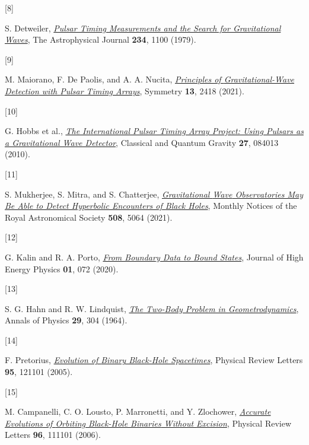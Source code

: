 \documentclass[
  10pt,
  a4paper,
  DIV=11,
  numbers=noendperiod,
  twoside]{scrreprt}
\newlength{\cslhangindent}
\newlength{\csllabelwidth}
\newlength{\cslentryspacingunit} %
\newenvironment{CSLReferences}[2] %
 {%
  \setlength{\parindent}{0pt}
  \ifodd #1
  \let\oldpar\par
  \def\par{\hangindent=\cslhangindent\oldpar}
  \fi
  \setlength{\parskip}{#2\cslentryspacingunit}
 }%
 {}
\newcommand{\CSLLeftMargin}[1]{\parbox[t]{\csllabelwidth}{#1}}
\newcommand{\CSLRightInline}[1]{\parbox[t]{\linewidth - \csllabelwidth}{#1}\break}
\DeclareRobustCommand{\[}{\begin{equation}}
\DeclareRobustCommand{\]}{\end{equation}}
\begin{document}
\begin{CSLReferences}{0}{0}
\leavevmode{}%
\CSLLeftMargin{{[}8{]} }%
\CSLRightInline{S. Detweiler,
\emph{\href{https://doi.org/10.1086/157593}{Pulsar Timing Measurements
and the Search for Gravitational Waves}}, The Astrophysical Journal
\textbf{234}, 1100 (1979).}

\leavevmode{}%
\CSLLeftMargin{{[}9{]} }%
\CSLRightInline{M. Maiorano, F. De Paolis, and A. A. Nucita,
\emph{\href{https://doi.org/10.3390/sym13122418}{Principles of
{Gravitational-Wave Detection} with {Pulsar Timing Arrays}}}, Symmetry
\textbf{13}, 2418 (2021).}

\leavevmode{}%
\CSLLeftMargin{{[}10{]} }%
\CSLRightInline{G. Hobbs et al.,
\emph{\href{https://doi.org/10.1088/0264-9381/27/8/084013}{The
International Pulsar Timing Array Project: Using Pulsars as a
Gravitational Wave Detector}}, Classical and Quantum Gravity
\textbf{27}, 084013 (2010).}

\leavevmode{}%
\CSLLeftMargin{{[}11{]} }%
\CSLRightInline{S. Mukherjee, S. Mitra, and S. Chatterjee,
\emph{\href{https://doi.org/10.1093/mnras/stab2721}{Gravitational {Wave}
Observatories May Be Able to Detect Hyperbolic Encounters of {Black
Holes}}}, Monthly Notices of the Royal Astronomical Society
\textbf{508}, 5064 (2021).}

\leavevmode{}%
\CSLLeftMargin{{[}12{]} }%
\CSLRightInline{G. Kalin and R. A. Porto,
\emph{\href{https://doi.org/10.1007/JHEP01(2020)072}{From Boundary Data
to Bound States}}, Journal of High Energy Physics \textbf{01}, 072
(2020).}

\leavevmode{}%
\CSLLeftMargin{{[}13{]} }%
\CSLRightInline{S. G. Hahn and R. W. Lindquist,
\emph{\href{https://doi.org/10.1016/0003-4916(64)90223-4}{The Two-Body
Problem in Geometrodynamics}}, Annals of Physics \textbf{29}, 304
(1964).}

\leavevmode{}%
\CSLLeftMargin{{[}14{]} }%
\CSLRightInline{F. Pretorius,
\emph{\href{https://doi.org/10.1103/PhysRevLett.95.121101}{Evolution of
{Binary Black-Hole Spacetimes}}}, Physical Review Letters \textbf{95},
121101 (2005).}

\leavevmode{}%
\CSLLeftMargin{{[}15{]} }%
\CSLRightInline{M. Campanelli, C. O. Lousto, P. Marronetti, and Y.
Zlochower,
\emph{\href{https://doi.org/10.1103/PhysRevLett.96.111101}{Accurate
{Evolutions} of {Orbiting Black-Hole Binaries} Without {Excision}}},
Physical Review Letters \textbf{96}, 111101 (2006).}


\end{CSLReferences}
\end{document}
